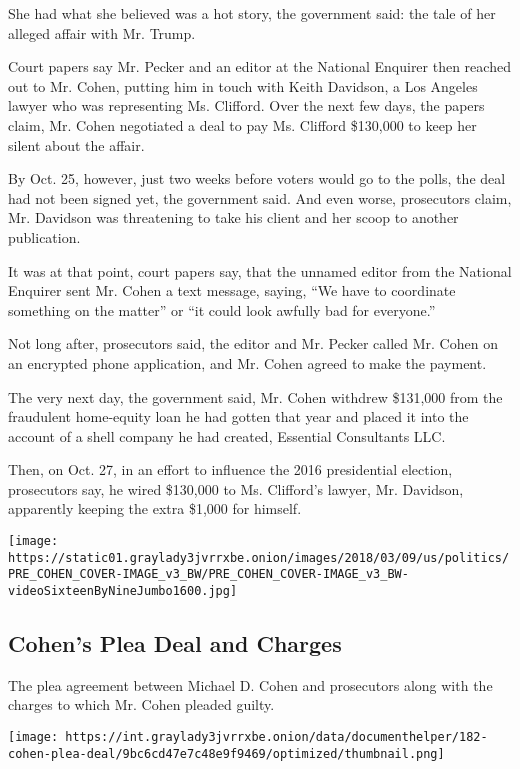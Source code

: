 She had what she believed was a hot story, the government said: the tale
of her alleged affair with Mr. Trump.

Court papers say Mr. Pecker and an editor at the National Enquirer then
reached out to Mr. Cohen, putting him in touch with Keith Davidson, a
Los Angeles lawyer who was representing Ms. Clifford. Over the next few
days, the papers claim, Mr. Cohen negotiated a deal to pay Ms. Clifford
\$130,000 to keep her silent about the affair.

By Oct. 25, however, just two weeks before voters would go to the polls,
the deal had not been signed yet, the government said. And even worse,
prosecutors claim, Mr. Davidson was threatening to take his client and
her scoop to another publication.

It was at that point, court papers say, that the unnamed editor from the
National Enquirer sent Mr. Cohen a text message, saying, ``We have to
coordinate something on the matter'' or ``it could look awfully bad for
everyone.''

Not long after, prosecutors said, the editor and Mr. Pecker called Mr.
Cohen on an encrypted phone application, and Mr. Cohen agreed to make
the payment.

The very next day, the government said, Mr. Cohen withdrew \$131,000
from the fraudulent home-equity loan he had gotten that year and placed
it into the account of a shell company he had created, Essential
Consultants LLC.

Then, on Oct. 27, in an effort to influence the 2016 presidential
election, prosecutors say, he wired \$130,000 to Ms. Clifford's lawyer,
Mr. Davidson, apparently keeping the extra \$1,000 for himself.

\texttt{[image: https://static01.graylady3jvrrxbe.onion/images/2018/03/09/us/politics/PRE\_COHEN\_COVER-IMAGE\_v3\_BW/PRE\_COHEN\_COVER-IMAGE\_v3\_BW-videoSixteenByNineJumbo1600.jpg]}

\hypertarget{cohens-plea-deal-and-charges}{%
\subsection{Cohen's Plea Deal and
Charges}\label{cohens-plea-deal-and-charges}}

The plea agreement between Michael D. Cohen and prosecutors along with
the charges to which Mr. Cohen pleaded guilty.

\texttt{[image: https://int.graylady3jvrrxbe.onion/data/documenthelper/182-cohen-plea-deal/9bc6cd47e7c48e9f9469/optimized/thumbnail.png]}

